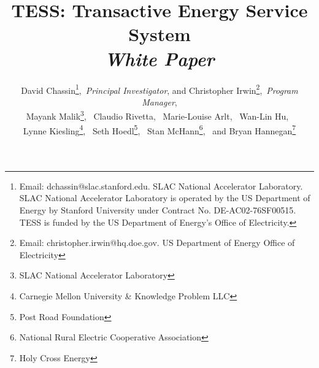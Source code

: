 \title
{
    TESS: Transactive Energy Service System
\\
    \textit{White Paper}
}

\author
{
    David Chassin\thanks{Email: dchassin@slac.stanford.edu. SLAC National Accelerator Laboratory. SLAC National Accelerator Laboratory is operated by the US Department of Energy by Stanford University under Contract No. DE-AC02-76SF00515.  TESS is funded by the US Department of Energy's Office of Electricity.},~\textit{Principal Investigator}, 
and
    Christopher Irwin\thanks{Email: christopher.irwin@hq.doe.gov. US Department of Energy Office of Electricity },~\textit{Program Manager},
\\
    Mayank Malik\thanks{SLAC National Accelerator Laboratory},~ 
    Claudio Rivetta\footnotemark[3],~
    Marie-Louise Arlt\footnotemark[3],~
    Wan-Lin Hu\footnotemark[3],~
\\
    Lynne Kiesling\thanks{Carnegie Mellon University \& Knowledge Problem LLC},~
    Seth Hoedl\thanks{Post Road Foundation},~
    Stan McHann\thanks{National Rural Electric Cooperative Association},~
    and
    Bryan Hannegan\thanks{Holy Cross Energy}
}

